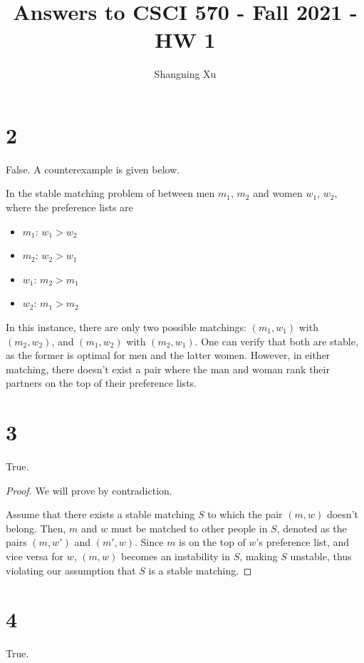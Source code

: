 \documentclass{article}
\title{Answers to CSCI 570 - Fall 2021 - HW 1}
\author{Shangning Xu}
\begin{document}
\maketitle

\section*{2}

False. A counterexample is given below.

In the stable matching problem of between men $m_1$, $m_2$ and women $w_1$, $w_2$, where the preference lists are

\begin{itemize}
	\item $m_1$: $w_1 > w_2$
	\item $m_2$: $w_2 > w_1$
	\item $w_1$: $m_2 > m_1$
	\item $w_2$: $m_1 > m_2$
\end{itemize}

In this instance, there are only two possible matchings: $(m_1, w_1)$ with $(m_2, w_2)$, and $(m_1, w_2)$ with $(m_2, w_1)$. One can verify that both are stable, as the former is optimal for men and the latter women. However, in either matching, there doesn't exist a pair where the man and woman rank their partners on the top of their preference lists.

\section*{3}

True.

\begin{proof}
	We will prove by contradiction.

	Assume that there exists a stable matching $S$ to which the pair $(m, w)$ doesn't belong. Then, $m$ and $w$ must be matched to other people in $S$, denoted as the pairs $(m, w')$ and $(m', w)$. Since $m$ is on the top of $w$'s preference list, and vice versa for $w$, $(m, w)$ becomes an instability in $S$, making $S$ unstable, thus violating our assumption that $S$ is a stable matching.
\end{proof}


\section*{4}

True.
\end{document}

